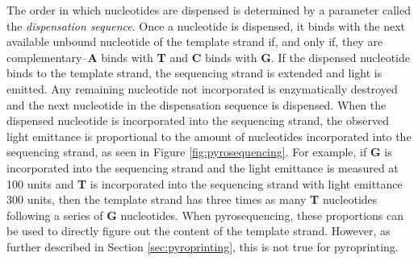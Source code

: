 \documentclass[12pt]{ucthesis}
\begin{document}
      The order in which nucleotides are dispensed is determined by
      a parameter called the \textit{dispensation sequence}. Once a nucleotide is
      dispensed, it binds with the next available unbound nucleotide of the
      template strand if, and only if, they are complementary--\textbf{A} binds
      with \textbf{T} and \textbf{C} binds with \textbf{G}. If the dispensed
      nucleotide binds to the template strand, the sequencing strand is
      extended and light is emitted. Any remaining nucleotide not incorporated
      is enzymatically destroyed and the next nucleotide in the dispensation
      sequence is dispensed. When the dispensed nucleotide is incorporated into
      the sequencing strand, the observed light emittance is proportional to
      the amount of nucleotides incorporated into the sequencing strand, as
      seen in Figure \ref{fig:pyrosequencing}. For example, if \textbf{G} is
      incorporated into the sequencing strand and the light emittance is
      measured at 100 units and \textbf{T} is incorporated into the sequencing
      strand with light emittance 300 units, then the template strand has three
      times as many \textbf{T} nucleotides following a series of \textbf{G}
      nucleotides. When pyrosequencing, these proportions can be used to
      directly figure out the content of the template strand. However, as
      further described in Section \ref{sec:pyroprinting}, this is not true for
      pyroprinting.
\end{document}
